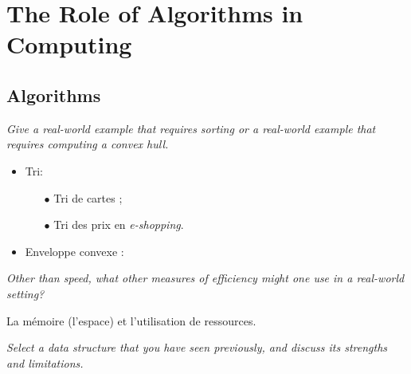 \section{The Role of Algorithms in Computing}

\subsection{Algorithms}

\begin{description}
   {\itshape Give a real-world example that requires sorting or a real-world example that requires computing a convex hull.}

    \begin{ex}
      \begin{itemize}
        \item Tri: 
          \begin{itemize}
            \item[$\bullet$] Tri de cartes ;
            \item[$\bullet$] Tri des prix en {\itshape e-shopping}.
          \end{itemize}
        \item Enveloppe convexe :  \cite{wiki:conv_hull}
      \end{itemize}
    \end{ex}

   {\itshape Other than speed, what other measures of efficiency might one use in a real-world setting?}

    \begin{ex}
      La m\'emoire (l'espace) et l'utilisation de ressources.
    \end{ex}

   {\itshape Select a data structure that you have seen previously, and discuss its strengths and limitations.}


\end{description}
